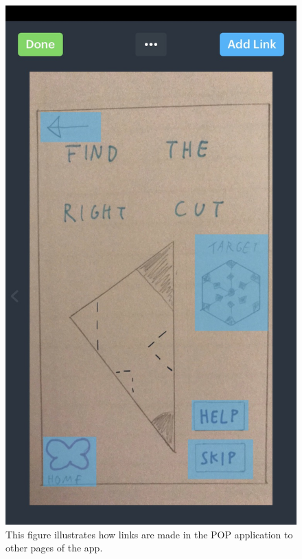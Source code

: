 \documentclass[11pt]{article}
\begin{document}
                \begin{figure}[!ht]
                        \begin{minipage}{0.45\textwidth}
                            \centering \includegraphics[width=0.7\linewidth]{Images/popLinks}
                            \caption{This figure illustrates how links are made in the POP application to other pages of the app.}
                            \label{fig:popLinks}
                        \end{minipage}\hfill
                        \begin{minipage}{0.45\textwidth}
                            \centering

\end{minipage}
\end{figure}
\end{document}
